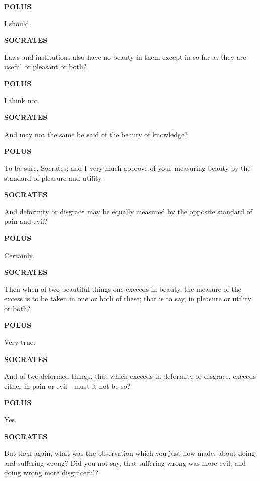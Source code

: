 \documentclass[11pt,letter]{article}
\begin{document}
\par \textbf{POLUS}
\par   I should.

\par \textbf{SOCRATES}
\par   Laws and institutions also have no beauty in them except in so far as they are useful or pleasant or both?

\par \textbf{POLUS}
\par   I think not.

\par \textbf{SOCRATES}
\par   And may not the same be said of the beauty of knowledge?

\par \textbf{POLUS}
\par   To be sure, Socrates; and I very much approve of your measuring beauty by the standard of pleasure and utility.

\par \textbf{SOCRATES}
\par   And deformity or disgrace may be equally measured by the opposite standard of pain and evil?

\par \textbf{POLUS}
\par   Certainly.

\par \textbf{SOCRATES}
\par   Then when of two beautiful things one exceeds in beauty, the measure of the excess is to be taken in one or both of these; that is to say, in pleasure or utility or both?

\par \textbf{POLUS}
\par   Very true.

\par \textbf{SOCRATES}
\par   And of two deformed things, that which exceeds in deformity or disgrace, exceeds either in pain or evil—must it not be so?

\par \textbf{POLUS}
\par   Yes.

\par \textbf{SOCRATES}
\par   But then again, what was the observation which you just now made, about doing and suffering wrong? Did you not say, that suffering wrong was more evil, and doing wrong more disgraceful?
\end{document}
